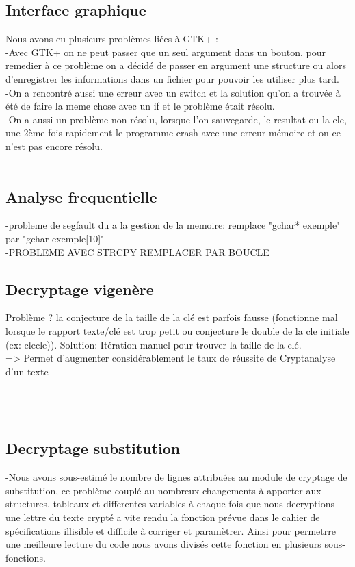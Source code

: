 \documentclass[a4]{article}
\begin{document}
	\subsection{Interface graphique}
	Nous avons eu plusieurs problèmes liées à GTK+ :\\
	-Avec GTK+ on ne peut passer que un seul argument dans un bouton, 
	pour remedier à ce problème on a décidé de passer en argument une structure ou alors d'enregistrer les informations dans un fichier pour 
	pouvoir les utiliser plus tard.\\
	-On a rencontré aussi une erreur avec un switch et la solution qu'on a trouvée à été de faire 
	la meme chose avec un if et le problème était résolu.\\
	
	-On a aussi un problème non résolu, lorsque l'on sauvegarde, le resultat ou la cle, une 2ème fois rapidement le programme crash 
	avec une erreur mémoire et on ce n'est pas encore résolu.\\
	\\
	
	\subsection{Analyse frequentielle}
	-probleme de segfault du a la gestion de la memoire: remplace "gchar* exemple" par "gchar exemple[10]"\\
	-PROBLEME AVEC STRCPY REMPLACER PAR BOUCLE
	\subsection{Decryptage vigenère}
 		Problème ? la conjecture de la taille de la clé est parfois fausse (fonctionne mal lorsque le rapport
		texte/clé est trop petit ou conjecture le double de la cle initiale (ex: clecle)).
		Solution: Itération manuel pour trouver la taille de la clé.\\
		=> Permet d'augmenter considérablement le taux de réussite de Cryptanalyse d'un texte \\ \\
		
  		 \\ \\
	
	\subsection{Decryptage substitution}
	-Nous avons sous-estimé le nombre de lignes attribuées au module de cryptage de substitution,
	 ce problème couplé au nombreux changements à apporter aux structures, tableaux et differentes
	  variables à chaque fois que nous decryptions une lettre du texte crypté a vite rendu la fonction
	   prévue dans le cahier de spécifications illisible et difficile à corriger et paramètrer. Ainsi 
	   pour permetrre une meilleure lecture du code nous avons divisés cette fonction en plusieurs sous-fonctions. \\ \\
\end{document}
